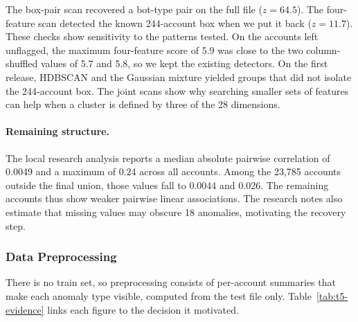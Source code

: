 \documentclass[../main.tex]{subfiles}
\begin{document}
The box-pair scan recovered a bot-type pair on the full file ($z=64.5$). The four-feature scan detected the known 244-account box when we put it back ($z=11.7$). These checks show sensitivity to the patterns tested. On the accounts left unflagged, the maximum four-feature score of 5.9 was close to the two column-shuffled values of 5.7 and 5.8, so we kept the existing detectors. On the first release, HDBSCAN and the Gaussian mixture yielded groups that did not isolate the 244-account box. The joint scans show why searching smaller sets of features can help when a cluster is defined by three of the 28 dimensions.

\paragraph{Remaining structure.} The local research analysis reports a median absolute pairwise correlation of 0.0049 and a maximum of 0.24 across all accounts. Among the 23,785 accounts outside the final union, those values fall to 0.0044 and 0.026. The remaining accounts thus show weaker pairwise linear associations. The research notes also estimate that missing values may obscure 18 anomalies, motivating the recovery step.

\subsubsection{Data Preprocessing}

There is no train set, so preprocessing consists of per-account summaries that make each anomaly type visible, computed from the test file only. Table~\ref{tab:t5-evidence} links each figure to the decision it motivated.
\end{document}
